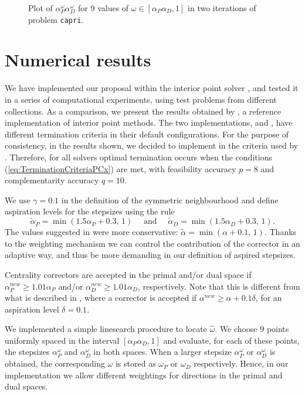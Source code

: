 \begin{figure}[ht]
\begin{minipage}[t]{0.49\textwidth}
  \end{minipage}
  \caption{Plot of $\alpha^\omega_P\alpha^\omega_D$ for 9 values 
           of $\omega \in [\alpha_P\alpha_D, 1]$
           in two iterations of problem {\tt capri}.}
  \label{fig:alphaomega}
\end{figure}


%
%
\section{Numerical results}
\label{sec:NumericalResults}

We have implemented our proposal within the \HOPDM interior point solver 
\cite{HOPDM}, and tested it in a series of computational 
experiments, using test problems from different collections. 
As a comparison, we present the results obtained by \PCx \cite{PCx}, 
a reference implementation of interior point methods.
The two implementations, \PCx and \HOPDM, have different termination criteria 
in their default configurations. For the purpose of consistency,
in the results shown, 
we decided to implement in \HOPDM the criteria used by \PCx.
Therefore, for all solvers optimal termination occurs when the conditions
(\ref{eq:TerminationCriteriaPCx}) are met, with feasibility
accuracy $p=8$ and complementarity accuracy $q = 10$.

We use $\gamma = 0.1$ in the definition of the symmetric 
neighbourhood and define aspiration levels for the stepsizes using the rule
\[
  \tilde{\alpha}_{P} = \min(1.5 \alpha_{P} \! + \! 0.3, \, 1) 
  \quad \mbox{ and } \quad
  \tilde{\alpha}_{D} = \min(1.5 \alpha_{D} \! + \! 0.3, \, 1). 
\]
The values suggested in \cite{Gondzio96} were more conservative:
$\tilde{\alpha} = \min (\alpha + 0.1, \, 1)$.
Thanks to the weighting mechanism we can control 
the contribution of the corrector in an adaptive way,
and thus be more demanding in our definition of aspired stepsizes.

Centrality correctors are accepted in the primal and/or dual space
if ${\alpha}_{P}^{new} \geq 1.01 \alpha_{P}$ 
and/or ${\alpha}_{D}^{new} \geq 1.01 \alpha_{D}$, respectively.
Note that this is different from what is described in \cite{Gondzio96}, where
a corrector is accepted if ${\alpha}^{new} \geq \alpha + 0.1\delta$, 
for an aspiration level $\delta = 0.1$.

We implemented a simple linesearch procedure to locate $\hat\omega$.
We choose 9 points uniformly spaced in the interval
$[\alpha_P\alpha_D, 1]$ and evaluate, for each of these points,
the stepsizes $\alpha^\omega_P$ and $\alpha^\omega_D$ in both spaces. 
When a larger stepsize $\alpha^\omega_P$ or $\alpha^\omega_D$ is obtained, 
the corresponding $\omega$ is stored as $\omega_P$ or $\omega_D$ 
respectively. Hence, in our implementation we allow different
weightings for directions in the primal and dual spaces.

